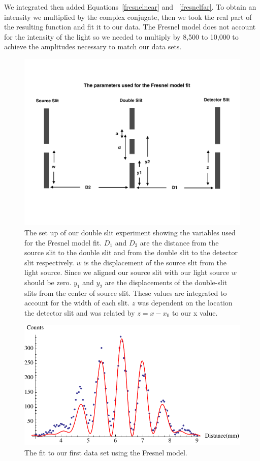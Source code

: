 \documentclass[prb,preprint]{revtex4-1}
\begin{document}
We integrated then added Equations~\ref{fresnelnear} and ~\ref{fresnelfar}. To obtain an intensity we multiplied by the complex conjugate, then we took the real part of the resulting function and fit it to our data. The Fresnel model does not account for the intensity of the light so we needed to multiply by 8,500 to 10,000 to achieve the amplitudes necessary to match our data sets. 

\begin{figure}[h!]
\centering
\includegraphics[width=6in]{fresnelsetup.pdf}
\caption{The set up of our double slit experiment showing the variables used for the Fresnel model fit. $D_1$ and $D_2$ are the distance from the source slit to the double slit and from the double slit to the detector slit respectively. $w$ is the displacement of the source slit from the light source. Since we aligned our source slit with our light source $w$ should be zero. $y_1$ and $y_2$ are the displacements of the double-slit slits from the center of source slit. These values are integrated to account for the width of each slit. $z$ was dependent on the location the detector slit and was related by $z = x - x_0$ to our x value.}
\label{fresnelsetup}
\end{figure}

\begin{figure}[h!]
\centering
\includegraphics[width=6in]{doublefresnel1.pdf}
\caption{The fit to our first data set using the Fresnel model.}
\label{doublefresnel1}
\end{figure}
\end{document}
